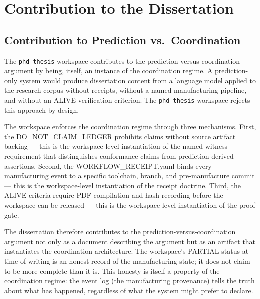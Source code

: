 
\section{Contribution to the Dissertation}
\label{sec:phd-thesis-contribution}

\subsection{Contribution to Prediction vs.~Coordination}
\label{sec:phd-thesis-contribution-prediction}

The \texttt{phd-thesis} workspace contributes to the prediction-versus-coordination argument
by being, itself, an instance of the coordination regime. A prediction-only system would
produce dissertation content from a language model applied to the research corpus without
receipts, without a named manufacturing pipeline, and without an ALIVE verification criterion.
The \texttt{phd-thesis} workspace rejects this approach by design.

The workspace enforces the coordination regime through three mechanisms. First, the
DO\_NOT\_CLAIM\_LEDGER prohibits claims without source artifact backing --- this is the
workspace-level instantiation of the named-witness requirement that distinguishes conformance
claims from prediction-derived assertions. Second, the WORKFLOW\_RECEIPT.yaml binds every
manufacturing event to a specific toolchain, branch, and pre-manufacture commit --- this is
the workspace-level instantiation of the receipt doctrine. Third, the ALIVE criteria require
PDF compilation and hash recording before the workspace can be released --- this is the
workspace-level instantiation of the proof gate.

The dissertation therefore contributes to the prediction-versus-coordination argument not only
as a document describing the argument but as an artifact that instantiates the coordination
architecture. The workspace's PARTIAL status at time of writing is an honest record of the
manufacturing state; it does not claim to be more complete than it is. This honesty is itself
a property of the coordination regime: the event log (the manufacturing provenance) tells the
truth about what has happened, regardless of what the system might prefer to declare.

